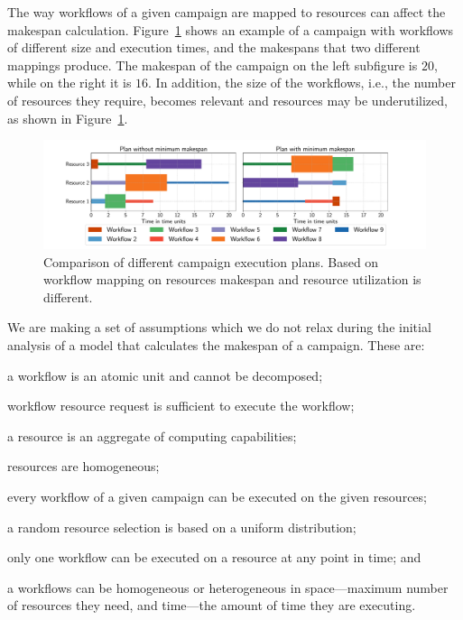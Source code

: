 The way workflows of a given campaign are mapped to resources can affect the makespan calculation. 
Figure~\ref{fig:example_makespan} shows an example of a campaign with workflows of different size and execution times, and the makespans that two different mappings produce.
The makespan of the campaign on the left subfigure is $20$, while on the right it is $16$.
In addition, the size of the workflows, i.e., the number of resources they require, becomes relevant and resources may be underutilized, as shown in Figure~\ref{fig:example_makespan}.

\begin{figure}[ht!]
    \centering
    \includegraphics[width=.95\textwidth]{figures/random_vs_specific.pdf}
    \caption{Comparison of different campaign execution plans. Based on workflow mapping on resources makespan and resource utilization is different.}\label{fig:example_makespan}
\end{figure}

We are making a set of assumptions which we do not relax during the initial analysis of a model that calculates the makespan of a campaign.
These are:
\begin{inparaenum}[(1)]
    \item a workflow is an atomic unit and cannot be decomposed;
    \item workflow resource request is sufficient to execute the workflow; %
    \item a resource is an aggregate of computing capabilities;
    \item resources are homogeneous;
    \item every workflow of a given campaign can be executed on the given resources;
    \item a random resource selection is based on a uniform distribution;
    \item only one workflow can be executed on a resource at any point in time; and
    \item a workflows can be homogeneous or heterogeneous in space---maximum number of resources they need, and time---the amount of time they are executing.
\end{inparaenum}

